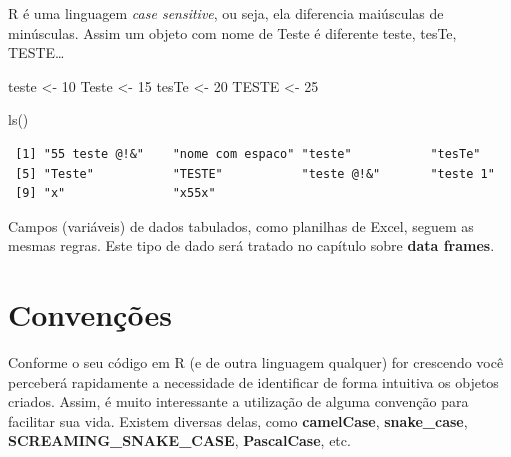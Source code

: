 \documentclass[
  letterpaper,
  DIV=11,
  numbers=noendperiod]{scrreprt}
\newenvironment{Shaded}{\begin{snugshade}}{\end{snugshade}}
\newcommand{\DecValTok}[1]{\textcolor[rgb]{0.68,0.00,0.00}{#1}}
\newcommand{\FunctionTok}[1]{\textcolor[rgb]{0.28,0.35,0.67}{#1}}
\newcommand{\NormalTok}[1]{\textcolor[rgb]{0.00,0.23,0.31}{#1}}
\newcommand{\OtherTok}[1]{\textcolor[rgb]{0.00,0.23,0.31}{#1}}
\begin{document}
R é uma linguagem \emph{case sensitive}, ou seja, ela diferencia
maiúsculas de minúsculas. Assim um objeto com nome de Teste é diferente
teste, tesTe, TESTE\ldots{}

\begin{Shaded}
\begin{Highlighting}[]
\NormalTok{teste }\OtherTok{\textless{}{-}} \DecValTok{10}
\NormalTok{Teste }\OtherTok{\textless{}{-}} \DecValTok{15}
\NormalTok{tesTe }\OtherTok{\textless{}{-}} \DecValTok{20}
\NormalTok{TESTE }\OtherTok{\textless{}{-}} \DecValTok{25}

\FunctionTok{ls}\NormalTok{()}
\end{Highlighting}
\end{Shaded}

\begin{verbatim}
 [1] "55 teste @!&"    "nome com espaco" "teste"           "tesTe"          
 [5] "Teste"           "TESTE"           "teste @!&"       "teste 1"        
 [9] "x"               "x55x"           
\end{verbatim}

\begin{tcolorbox}[enhanced jigsaw, bottomtitle=1mm, colframe=quarto-callout-tip-color-frame, coltitle=black, left=2mm, opacitybacktitle=0.6, opacityback=0, breakable, arc=.35mm, titlerule=0mm, title=\textcolor{quarto-callout-tip-color}{\faLightbulb}\hspace{0.5em}{Campos de Tabelas}, colbacktitle=quarto-callout-tip-color!10!white, toptitle=1mm, leftrule=.75mm, bottomrule=.15mm, toprule=.15mm, colback=white, rightrule=.15mm]

Campos (variáveis) de dados tabulados, como planilhas de Excel, seguem
as mesmas regras. Este tipo de dado será tratado no capítulo sobre
\textbf{data frames}.

\end{tcolorbox}

\hypertarget{convenuxe7uxf5es}{%
\section{Convenções}\label{convenuxe7uxf5es}}

Conforme o seu código em R (e de outra linguagem qualquer) for crescendo
você perceberá rapidamente a necessidade de identificar de forma
intuitiva os objetos criados. Assim, é muito interessante a utilização
de alguma convenção para facilitar sua vida. Existem diversas delas,
como \textbf{camelCase}, \textbf{snake\_case},
\textbf{SCREAMING\_SNAKE\_CASE}, \textbf{PascalCase}, etc.
\end{document}
